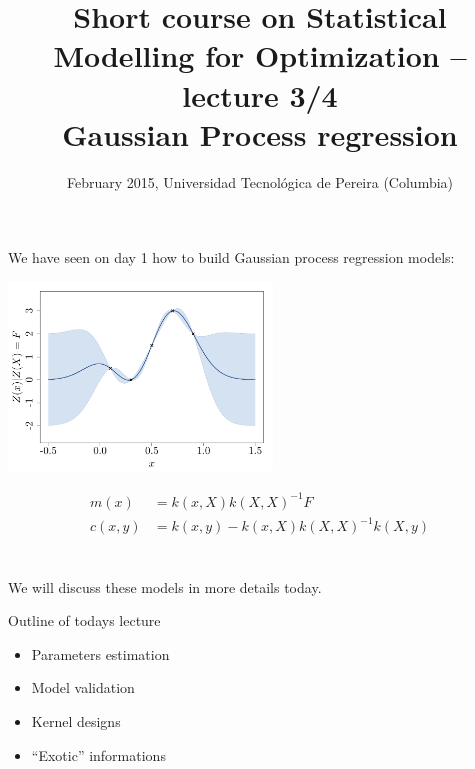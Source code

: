 \documentclass{beamer}
\title[Short course on Statistical Modeling for Optimization -- lecture 3/4]{ \small Short course on Statistical Modelling for Optimization -- lecture 3/4 \\ \vspace{3mm} \LARGE Gaussian Process regression}
\institute[Mines St-\'Etienne]{Nicolas Durrande (durrande@emse.fr) -- Mines St-\'Etienne (France)}
\author[Pereira, February 2015]{February 2015, Universidad Tecnol\'ogica de Pereira (Columbia)}
\date{\null}
\begin{document}

\begin{frame}
  \titlepage
\end{frame}

\begin{frame}{}
We have seen on day 1 how to build Gaussian process regression models:
\vspace{-2mm}
\begin{center}
\includegraphics[height=5cm]{figures/python/GPR}
\end{center}
\begin{equation*}
	\begin{split}
		m(x) &= k(x,X)k(X,X)^{-1}F\\
		c(x,y) &= k(x,y) - k(x,X)k(X,X)^{-1}k(X,y)
	\end{split}
\end{equation*}
\\ \ \\
We will discuss these models in more details today.
\end{frame}

\begin{frame}{}
Outline of todays lecture
\vspace{0.2cm}
\begin{itemize}
	\item Parameters estimation
	\item Model validation
	\item Kernel designs
	\item ``Exotic'' informations
\end{itemize}
\end{frame}
\end{document}

